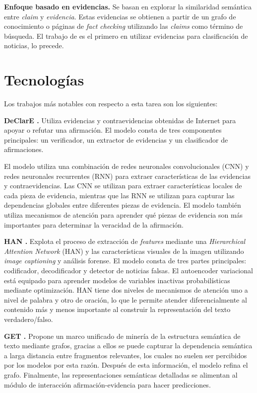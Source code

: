 \textbf{Enfoque basado en evidencias.} Se basan en explorar la similaridad semántica entre \textit{claim} y \textit{evidencia}. Estas evidencias se obtienen a partir de un grafo de conocimiento o páginas de \textit{fact checking} utilizando las \textit{claims} como término de búsqueda. El trabajo de \citet{Popat2018} es el primero en utilizar evidencias para clasificación de noticias, \citet{Ma2019,Wu2021} lo precede.

\section{Tecnologías}

Los trabajos más notables con respecto a esta tarea son los siguientes:

\textbf{DeClarE \citep{Popat2018}.} Utiliza evidencias y contraevidencias obtenidas de Internet para apoyar o refutar una afirmación. El modelo consta de tres componentes principales: un verificador, un extractor de evidencias y un clasificador de afirmaciones. 

El modelo utiliza una combinación de redes neuronales convolucionales (CNN) y redes neuronales recurrentes (RNN) para extraer características de las evidencias y contraevidencias. Las CNN se utilizan para extraer características locales de cada pieza de evidencia, mientras que las RNN se utilizan para capturar las dependencias globales entre diferentes piezas de evidencia. El modelo también utiliza mecanismos de atención para aprender qué piezas de evidencia son más importantes para determinar la veracidad de la afirmación.

\textbf{HAN \citep{Ma2019}.} Explota el proceso de extracción de \textit{features} mediante una \textit{Hierarchical Attention Network} (HAN) y las características visuales de la imagen utilizando \textit{image captioning} y análisis forense. El modelo consta de tres partes principales: codificador, decodificador y detector de noticias falsas. El autoencoder variacional está equipado para aprender modelos de variables inactivas probabilísticas mediante optimización. HAN tiene dos niveles de mecanismos de atención uno a nivel de palabra y otro de oración, lo que le permite atender diferencialmente al contenido más y menos importante al construir la representación del texto verdadero/falso.

\textbf{GET \citep{Xu2022}.} Propone un marco unificado de minería de la estructura semántica de texto mediante grafos, gracias a ellos se puede capturar la dependencia semántica a larga distancia entre fragmentos relevantes, los cuales no suelen ser percibidos por los modelos por esta razón. Después de esta información, el modelo refina el grafo. Finalmente, las representaciones semánticas detalladas se alimentan al módulo de interacción afirmación-evidencia para hacer predicciones.

